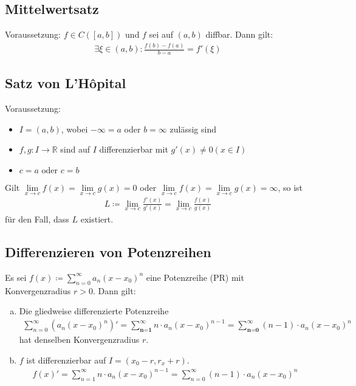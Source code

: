 \subsection{Mittelwertsatz}
Voraussetzung: $f \in C([a,b])$ und $f$ sei auf $(a,b)$ diffbar. Dann gilt: 
\begin{align*}
    \exists \xi \in (a,b): \frac{f(b) - f(a)}{b-a} = f'(\xi)
\end{align*}

\subsection{Satz von L'Hôpital}
Voraussetzung:
\begin{itemize}
    \item $I=(a,b)$, wobei $-\infty=a$ oder $b=\infty$ zulässig sind
    \item $f,g: I \to \mathbb{R}$ sind auf $I$ differenzierbar mit $g'(x) \neq 0 (x \in I)$
    \item $c=a \text{ oder } c=b$
\end{itemize}
Gilt $\lim \limits_{x \to c} f(x) = \lim \limits_{x \to c} g(x) = 0$ oder $\lim \limits_{x \to c} f(x) = \lim \limits_{x \to c} g(x) = \infty$, so ist 
\begin{align*}
    L \coloneqq \lim \limits_{x \to c} \frac{f'(x)}{g'(x)} =  \lim \limits_{x \to c} \frac{f(x)}{g(x)}
\end{align*}
für den Fall, dass $L$ existiert.

\subsection{Differenzieren von Potenzreihen}
Es sei $ f(x) \coloneqq \sum \limits_{n=0}^{\infty} a_n(x-x_0)^n$ eine Potenzreihe (PR) mit Konvergenzradius $r>0$. Dann gilt:
\begin{enumerate}[a)]
    \item Die \glqq gliedweise differenzierte\grqq{} Potenzreihe
    \begin{align*}
        \sum \limits_{n=0}^{\infty} (a_n(x-x_0)^n)' 
        = \sum \limits_{\textbf{n=1}}^{\infty} n \cdot a_n(x-x_0)^{n-1} 
        = \sum \limits_{\textbf{n=0}}^{\infty} (n-1) \cdot a_n(x-x_0)^{n}
    \end{align*}
    hat denselben Konvergenzradius $r$.
    \item $f$ ist differenzierbar auf $I = (x_0-r,r_x+r)$.
    \begin{align*}
        f(x)'
        = \sum \limits_{n=1}^{\infty} n \cdot a_n(x-x_0)^{n-1} 
        = \sum \limits_{n=0}^{\infty} (n-1) \cdot a_n(x-x_0)^{n}
    \end{align*}
\end{enumerate}


